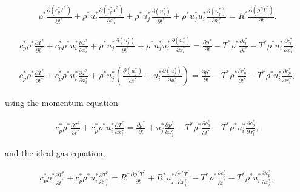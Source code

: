 \begin{equation*}
\begin{split}
\rho^*
\frac{\partial  (c_p^*T^*)}{\partial  t^*}
+
\rho^*
u_i^*
\frac{\partial (c_p^*T^*)}{\partial  x_i^*}
+
\rho^*
u_j^*
\frac{\partial  (u_j^*)}{\partial  t^*}
+
\rho^*
u_j^*
u_i^*
\frac{\partial (u_j^*)}{\partial  x_i^*}
=
R^*
\frac{\partial (\rho^* T^*)}{\partial t} 
.
\end{split}
\end{equation*} 

\begin{equation*}
\begin{split}
c_p^*
\rho^*
\frac{\partial  T^*}{\partial  t^*}
+
c_p^*
\rho^*
u_i^*
\frac{\partial T^*}{\partial  x_i^*}
+
\rho^*
u_j^*
\frac{\partial  (u_j^*)}{\partial  t^*}
+
\rho^*
u_j^*
u_i^*
\frac{\partial (u_j^*)}{\partial  x_i^*}
=
\frac{\partial p^*}{\partial t} 
-
T^*
\rho^*
\frac{\partial  c_p^*}{\partial  t^*}
-
T^*
\rho^*
u_i^*
\frac{\partial c_p^*}{\partial  x_i^*}
.
\end{split}
\end{equation*} 

\begin{equation*}
\begin{split}
c_p^*
\rho^*
\frac{\partial  T^*}{\partial  t^*}
+
c_p^*
\rho^*
u_i^*
\frac{\partial T^*}{\partial  x_i^*}
+
\rho^*
u_j^*
\left(
\frac{\partial  (u_j^*)}{\partial  t^*}
+
u_i^*
\frac{\partial (u_j^*)}{\partial  x_i^*}
\right)
=
\frac{\partial p^*}{\partial t} 
-
T^*
\rho^*
\frac{\partial  c_p^*}{\partial  t^*}
-
T^*
\rho^*
u_i^*
\frac{\partial c_p^*}{\partial  x_i^*}
,
\end{split}
\end{equation*} 

using the momentum equation

\begin{equation*}
\begin{split}
c_p^*
\rho^*
\frac{\partial  T^*}{\partial  t^*}
+
c_p^*
\rho^*
u_i^*
\frac{\partial T^*}{\partial  x_i^*}
=
\frac{\partial p^*}{\partial t} 
+
u_j^*
\frac{\partial p^*}{\partial x_j^*} 
-
T^*
\rho^*
\frac{\partial  c_p^*}{\partial  t^*}
-
T^*
\rho^*
u_i^*
\frac{\partial c_p^*}{\partial  x_i^*}
,
\end{split}
\end{equation*} 

and the  ideal gas equation,

\begin{equation*}
\begin{split}
c_p^*
\rho^*
\frac{\partial  T^*}{\partial  t^*}
+
c_p^*
\rho^*
u_i^*
\frac{\partial T^*}{\partial  x_i^*}
=
R^*
\frac{\partial \rho^* T^*}{\partial t} 
+
R^*
u_j^*
\frac{\partial \rho^* T^*}{\partial x_j^*} 
-
T^*
\rho^*
\frac{\partial  c_p^*}{\partial  t^*}
-
T^*
\rho^*
u_i^*
\frac{\partial c_p^*}{\partial  x_i^*}
,
\end{split}
\end{equation*} 

